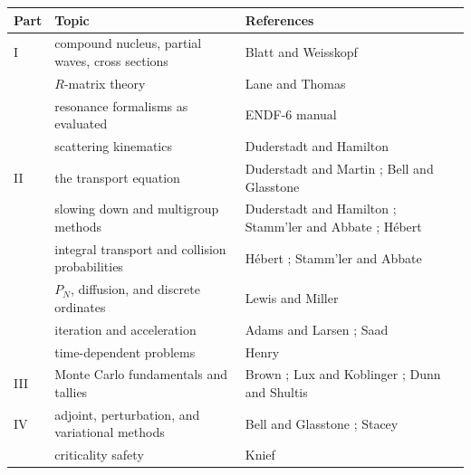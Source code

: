 \begin{center}
 {\small
 \begin{tabular*}{0.95\textwidth}{@{\extracolsep{\fill}} l>{\raggedright\arraybackslash}p{}>{\raggedright\arraybackslash}p{} }
  \toprule
   Part & Topic & References \\
  \midrule
   I   & compound nucleus, partial waves, cross sections & Blatt and Weisskopf \cite{blatt1952tnp} \\
       & $R$-matrix theory                     & Lane and Thomas \cite{lane1958rmt} \\
       & resonance formalisms as evaluated     & ENDF-6 manual \cite{trkov2018endf} \\
       & scattering kinematics                 & Duderstadt and Hamilton \cite{duderstadt1976nra} \\
  \midrule
   II  & the transport equation                & Duderstadt and Martin \cite{duderstadt1976tt}; Bell and Glasstone \cite{bell1970nrt} \\
       & slowing down and multigroup methods   & Duderstadt and Hamilton \cite{duderstadt1976nra}; Stamm'ler and Abbate \cite{stammler1983mss}; H\'ebert \cite{hebert2009arp} \\
       & integral transport and collision probabilities & H\'ebert \cite{hebert2009arp}; Stamm'ler and Abbate \cite{stammler1983mss} \\
       & $P_N$, diffusion, and discrete ordinates & Lewis and Miller \cite{lewis1993cmn} \\
       & iteration and acceleration            & Adams and Larsen \cite{adams2002fim}; Saad \cite{saad2003ims} \\
       & time-dependent problems               & Henry \cite{henry1975nra} \\
  \midrule
   III & Monte Carlo fundamentals and tallies  & Brown \cite{brown2005fmc}; Lux and Koblinger \cite{lux1991mcp}; Dunn and Shultis \cite{dunn2012emc} \\
  \midrule
   IV  & adjoint, perturbation, and variational methods & Bell and Glasstone \cite{bell1970nrt}; Stacey \cite{stacey1974vmn} \\
       & criticality safety                    & Knief \cite{knief1991ncs} \\
  \bottomrule
 \end{tabular*}
 }
\end{center}
